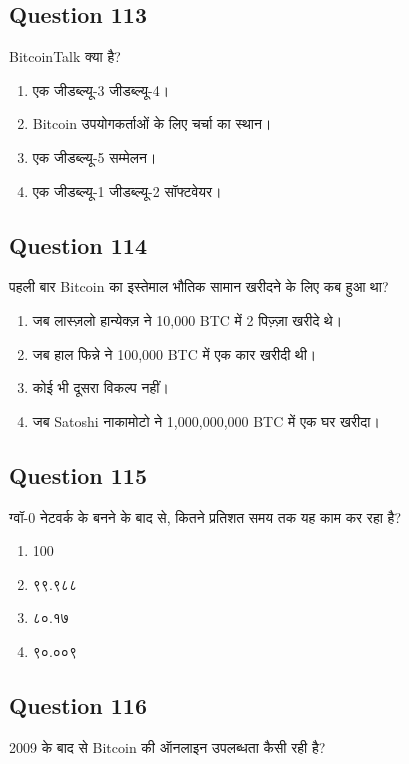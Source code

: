 \documentclass[12pt,a4paper]{article}
\begin{document}
\bigskip


\subsection*{Question 113}
BitcoinTalk क्या है?

\begin{enumerate}[label=\Alph*., leftmargin=*]
\item एक जीडब्ल्यू-3 जीडब्ल्यू-4।
\item Bitcoin उपयोगकर्ताओं के लिए चर्चा का स्थान।
\item एक जीडब्ल्यू-5 सम्मेलन।
\item एक जीडब्ल्यू-1 जीडब्ल्यू-2 सॉफ्टवेयर।
\end{enumerate}

\bigskip


\subsection*{Question 114}
पहली बार Bitcoin का इस्तेमाल भौतिक सामान खरीदने के लिए कब हुआ था?

\begin{enumerate}[label=\Alph*., leftmargin=*]
\item जब लास्ज़लो हान्येक्ज़ ने 10,000 BTC में 2 पिज़्ज़ा खरीदे थे।
\item जब हाल फिन्ने ने 100,000 BTC में एक कार खरीदी थी।
\item कोई भी दूसरा विकल्प नहीं।
\item जब Satoshi नाकामोटो ने 1,000,000,000 BTC में एक घर खरीदा।
\end{enumerate}

\bigskip


\subsection*{Question 115}
ग्वॉ-0 नेटवर्क के बनने के बाद से, कितने प्रतिशत समय तक यह काम कर रहा है?

\begin{enumerate}[label=\Alph*., leftmargin=*]
\item 100%
\item ९९.९८८%
\item ८०.१७%
\item ९०.००९%
\end{enumerate}

\bigskip


\subsection*{Question 116}
2009 के बाद से Bitcoin की ऑनलाइन उपलब्धता कैसी रही है?
\end{document}
